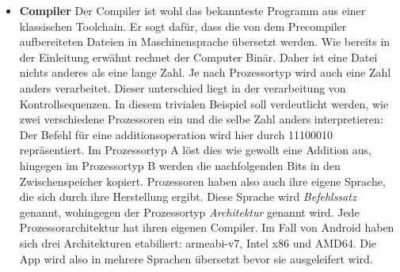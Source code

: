 \begin{itemize}
\item \textbf{Compiler} Der Compiler ist wohl das bekannteste Programm aus einer klassischen Toolchain. Er sogt dafür, dass die von dem Precompiler aufbereiteten Dateien in Maschinensprache übersetzt werden.
Wie bereits in der Einleitung erwähnt rechnet der Computer Binär. Daher ist eine Datei nichts anderes als eine lange Zahl. Je nach Prozessortyp wird auch eine Zahl anders verarbeitet. Dieser unterschied liegt in der verarbeitung von Kontrollsequenzen. In diesem trivialen Beispiel soll verdeutlicht werden, wie zwei verschiedene Prozessoren ein und die selbe Zahl anders interpretieren: Der Befehl für eine additionsoperation wird hier durch 11100010 repräsentiert. Im Prozessortyp A löst dies wie gewollt eine Addition aus, hingegen im Prozessortyp B werden die nachfolgenden Bits in den Zwischenspeicher kopiert. Prozessoren haben also auch ihre eigene Sprache, die sich durch ihre Herstellung ergibt. Diese Sprache wird \textit{Befehlssatz} genannt, wohingegen der Prozessortyp \textit{Architektur} genannt wird. Jede Prozessorarchitektur hat ihren eigenen Compiler.
Im Fall von Android haben sich drei Architekturen etabiliert: armeabi-v7, Intel x86 und AMD64. Die App wird also in mehrere Sprachen übersetzt bevor sie ausgeleifert wird.
\end{itemize}

\newpage

